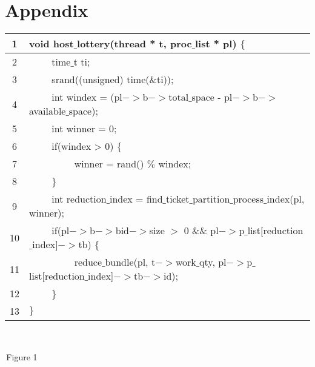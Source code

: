 \documentclass[acmsmall]{acmart}
\def\tab{\,$\quad \quad$\,}
\def\small{\,\par \smallskip\,}
\begin{document}
\section{Appendix}
\begin{tabular}{c|l}
  \hline
  1 & void host$\_$lottery(thread * t, proc$\_$list * pl) $\{$ \\
  \hline
  2 & \tab time$\_$t ti; \\
  3 & \tab srand((unsigned) time($\&$ti)); \\
  4 & \tab int windex = (pl$->$b$->$total$\_$space - pl$->$b$->$available$\_$space); \\
  5 & \tab int winner = 0; \\
  6 & \tab if(windex > 0) $\{$ \\
  7 & \tab \tab winner = rand() $\%$ windex; \\
  8 & \tab $\}$ \\
  9 & \tab int reduction$\_$index = find$\_$ticket$\_$partition$\_$process$\_$index(pl, winner); \\
  10 & \tab if(pl$->$b$->$bid$->$size $>$ 0 $\&\&$ pl$->$p$\_$list$[$reduction$\_$index$]->$tb) $\{$ \\
  11 & \tab \tab reduce$\_$bundle(pl, t$->$work$\_$qty, pl$->$p$\_$list[reduction$\_$index]$->$tb$->$id); \\
  12 & \tab $\}$ \\
  13 & $\}$ \\
  \hline
\end{tabular}
\par
\small{Figure 1}
\end{document}
